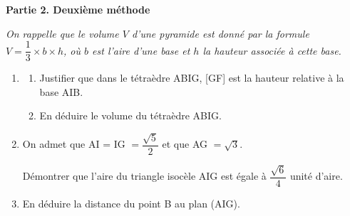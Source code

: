 \bigskip

\textbf{Partie 2. Deuxième méthode}

\medskip

\emph{On rappelle que le volume $V$ d'une pyramide est donné par la formule $V = \dfrac{1}{3} \times  b \times h$, où $b$ est l'aire d'une base et $h$ la hauteur associée à cette base.}

\medskip

\begin{enumerate}
\item 
	\begin{enumerate}
		\item Justifier que dans le tétraèdre ABIG, [GF] est la hauteur relative à la base AIB. 
		\item En déduire le volume du tétraèdre ABIG.
	\end{enumerate}
\item On admet que AI = IG $= \dfrac{\sqrt{5}}{2}$ et que AG $= \sqrt 3$.

Démontrer que l'aire du triangle isocèle AIG est égale à $\dfrac{\sqrt{6}}{4}$ unité d'aire.
\item En déduire la distance du point B au plan (AIG).
\end{enumerate}
